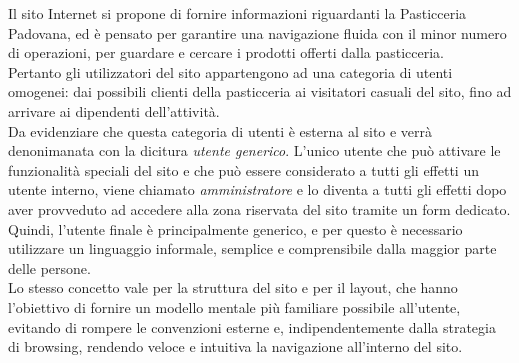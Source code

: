 Il sito Internet si propone di fornire informazioni riguardanti la Pasticceria Padovana, ed è pensato per garantire una navigazione fluida con il minor numero di operazioni, 
per guardare e cercare i prodotti offerti dalla pasticceria.\\
Pertanto gli utilizzatori del sito appartengono ad una categoria di utenti omogenei: dai possibili clienti della pasticceria ai visitatori casuali del sito, 
fino ad arrivare ai dipendenti dell'attività.\\
Da evidenziare che questa categoria di utenti è esterna al sito e verrà denonimanata con la dicitura \emph{utente generico}.
L'unico utente che può attivare le funzionalità speciali del sito e che può essere considerato a tutti gli effetti un utente interno, viene chiamato \emph{amministratore} e 
lo diventa a tutti gli effetti dopo aver provveduto ad accedere alla zona riservata del sito tramite un form dedicato.\\
Quindi, l'utente finale è principalmente generico, e per questo è necessario utilizzare un linguaggio informale, semplice e comprensibile dalla maggior parte delle persone.\\ 
Lo stesso concetto vale per la struttura del sito e per il layout, che hanno l'obiettivo di fornire un modello mentale più familiare possibile all'utente, 
evitando di rompere le convenzioni esterne e, indipendentemente dalla strategia di browsing, rendendo veloce e intuitiva la navigazione all'interno del sito.\\